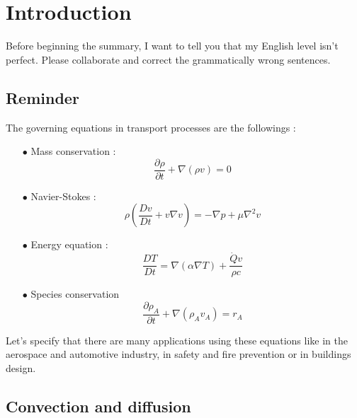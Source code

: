 
\chapter{Introduction}
Before beginning the summary, I want to tell you that my English level isn't perfect. Please collaborate and correct the grammatically wrong sentences.\\

\section{Reminder}
The governing equations in transport processes are the followings :
\begin{itemize}
	\item[$\bullet$] Mass conservation : 
	      \begin{equation}
	      	\frac{\partial \rho}{\partial t} + \nabla (\rho v) = 0
	      \end{equation}
	\item[$\bullet$] Navier-Stokes :
	      \begin{equation}
	      	\rho \left(\frac{Dv}{Dt} + v \nabla v \right) = -\nabla p + \mu \nabla ^2 v
	      \end{equation}		 
	\item[$\bullet$] Energy equation :
	      \begin{equation}
	      	\frac{DT}{Dt} = \nabla (\alpha \nabla T) + \frac{\dot{Q}v}{\rho c}
	      \end{equation}
	\item[$\bullet$] Species conservation
	      \begin{equation}
	      	\frac{\partial \rho _A}{\partial t} + \nabla (\rho _A v_A) = r_A
	      \end{equation}
\end{itemize}
Let's specify that there are many applications using these equations like in the aerospace and automotive industry, in safety and fire prevention or in buildings design.  
	
\section{Convection and diffusion}
